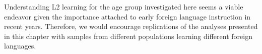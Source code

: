 \documentclass[output=paper]{langsci/langscibook}
\begin{document}
Understanding L2 learning for the age group investigated here seems a viable endeavor given the importance attached to early foreign language instruction in recent years. Therefore, we would encourage replications of the analyses presented in this chapter with samples from different populations learning different foreign languages. 

{\sloppy\printbibliography[heading=subbibliography,notkeyword=this]}
\end{document}
